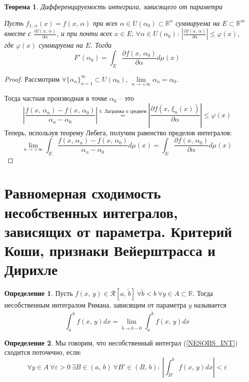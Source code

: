 \documentclass[a4paper,12pt]{article}
\renewcommand{\phi}{\ensuremath{\varphi}}
\renewcommand{\leq}{\ensuremath{\leqslant}}
\theoremstyle{plain}
\newtheorem{theorem}{Теорема}[section]
\theoremstyle{definition}
\newtheorem{definition}{Определение}[section]
\theoremstyle{remark}
\begin{document}
\begin{theorem}
	Дифференцируемость интеграла, зависящего от параметра

	Пусть $f_{1,\,\alpha}(x) = f(x,\,\alpha)$ при всех $\alpha \in U(\alpha_0) \subset \mathbb{R}^n$ суммируема на $E \subset \mathbb{R}^m$ вместе с $\frac{\partial f(x,\,\alpha)}{\partial \alpha}$, и при почти всех $x \in E,\, \forall \alpha \in U(\alpha_0)$: $\left|\frac{\partial f(x,\,\alpha)}{\partial \alpha}\right| \leq \phi(x)$, где $\phi(x)$ суммируема на $E$. Тогда
	\[F'(\alpha_0) = \int_E \frac{\partial f(x,\,\alpha_0)}{\partial \alpha}d\mu(x)\]
\end{theorem}

\begin{proof}
	Рассмотрим $\forall \{\alpha_n\}_{n = 1}^\infty \subset \dot{U}(\alpha_0),\, \lim\limits_{n \to +\infty}\alpha_n = \alpha_0$.

	Тогда частная производная в точке $\alpha_0$ -- это
	\[\left|\frac{f(x,\,\alpha_n) - f(x,\,\alpha_0)}{\alpha_n - \alpha_0}\right| \stackrel{\text{т. Лагранжа о среднем}}{=} \left|\frac{\partial f(x,\,\xi_n(x))}{\partial \alpha}\right| \leq \phi(x)\]
	Теперь, используя теорему Лебега, получим равенство пределов интегралов:
	\[\lim_{n \to +\infty}\int_E \frac{f(x,\,\alpha_n) - f(x,\,\alpha_0)}{\alpha_n - \alpha_0}d\mu(x) = \int_E \frac{\partial f(x,\,\alpha_0)}{\partial	\alpha}d\mu(x)\]
\end{proof}

\section{Равномерная сходимость несобственных интегралов, зависящих от параметра. Критерий Коши, признаки Вейерштрасса и Дирихле}
\begin{definition}
	Пусть $f(x,\,y) \in \mathcal{R}[a,\,\tilde{b}] \: \forall \tilde{b} < b \: \forall y \in A \subset \mathbb{R}$. Тогда несобственным интегралом Римана, зависящим от параметра $y$ называется
	\begin{equation} \label{NESOBS_INT}
		\int_a^b f(x,\,y)dx = \lim_{\tilde{b} \to b - 0} \int_a^{\tilde{b}}f(x,\,y)dx
	\end{equation}
\end{definition}

\begin{definition}
	Мы говорим, что несобственный интеграл (\ref{NESOBS_INT}) сходится поточечно, если:
	\[\forall y \in A \: \forall \varepsilon > 0 \: \exists B \in (a,\,b) \: \forall B' \in (B,\,b):\: \left|\int_{B'}^b f(x,\,y)dx\right| < \varepsilon\]
\end{definition}
\end{document}
